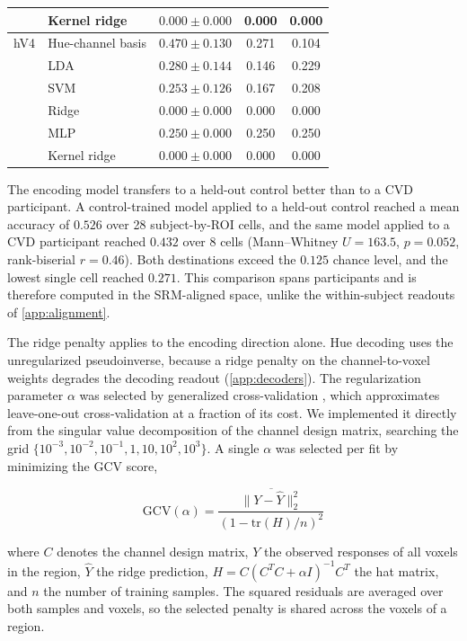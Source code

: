 \begin{table}[h]
\begin{tabular}{llccc}
   & Kernel ridge & $0.000 \pm 0.000$ & 0.000 & 0.000 \\
\midrule
hV4 & Hue-channel basis & $\mathbf{0.470 \pm 0.130}$ & 0.271 & 0.104 \\
   & LDA & $0.280 \pm 0.144$ & 0.146 & 0.229 \\
   & SVM & $0.253 \pm 0.126$ & 0.167 & 0.208 \\
   & Ridge & $0.000 \pm 0.000$ & 0.000 & 0.000 \\
   & MLP & $0.250 \pm 0.000$ & 0.250 & 0.250 \\
   & Kernel ridge & $0.000 \pm 0.000$ & 0.000 & 0.000 \\
\bottomrule
\end{tabular}
\end{table}
The encoding model transfers to a held-out control better than to a CVD participant. A control-trained model applied to a held-out control reached a mean accuracy of $0.526$ over 28 subject-by-ROI cells, and the same model applied to a CVD participant reached $0.432$ over 8 cells (Mann--Whitney $U = 163.5$, $p = 0.052$, rank-biserial $r = 0.46$). Both destinations exceed the $0.125$ chance level, and the lowest single cell reached $0.271$. This comparison spans participants and is therefore computed in the SRM-aligned space, unlike the within-subject readouts of \cref{app:alignment}.




The ridge penalty applies to the encoding direction alone. Hue decoding uses the unregularized pseudoinverse, because a ridge penalty on the channel-to-voxel weights degrades the decoding readout (\cref{app:decoders}). The regularization parameter $\alpha$ was selected by generalized cross-validation \parencite{golub1979}, which approximates leave-one-out cross-validation at a fraction of its cost. We implemented it directly from the singular value decomposition of the channel design matrix, searching the grid $\{10^{-3}, 10^{-2}, 10^{-1}, 1, 10, 10^{2}, 10^{3}\}$. A single $\alpha$ was selected per fit by minimizing the GCV score,

\begin{equation}
\text{GCV}(\alpha) = \frac{\overline{\|Y - \hat{Y}\|_2^2}}{\left(1 - \text{tr}(H)/n\right)^2}
\end{equation}

where $C$ denotes the channel design matrix, $Y$ the observed responses of all voxels in the region, $\hat{Y}$ the ridge prediction, $H = C(C^T C + \alpha I)^{-1}C^T$ the hat matrix, and $n$ the number of training samples.
The squared residuals are averaged over both samples and voxels, so the selected penalty is shared across the voxels of a region.


